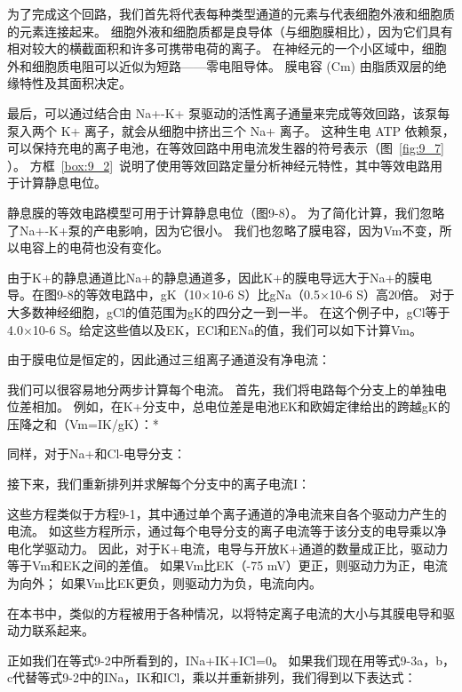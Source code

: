 为了完成这个回路，我们首先将代表每种类型通道的元素与代表细胞外液和细胞质的元素连接起来。
细胞外液和细胞质都是良导体（与细胞膜相比），因为它们具有相对较大的横截面积和许多可携带电荷的离子。
在神经元的一个小区域中，细胞外和细胞质电阻可以近似为短路——零电阻导体。
膜电容 (Cm) 由脂质双层的绝缘特性及其面积决定。


最后，可以通过结合由 Na+-K+ 泵驱动的活性离子通量来完成等效回路，该泵每泵入两个 K+ 离子，就会从细胞中挤出三个 Na+ 离子。
这种生电 ATP 依赖泵，可以保持充电的离子电池，在等效回路中用电流发生器的符号表示（图~\ref{fig:9_7} ）。
方框~\ref{box:9_2}~说明了使用等效回路定量分析神经元特性，其中等效电路用于计算静息电位。


\begin{proposition}[利用等效电路模型计算静息膜电位] \label{box:9_2}
	
	\quad \quad 静息膜的等效电路模型可用于计算静息电位（图9-8）。
	为了简化计算，我们忽略了Na+-K+泵的产电影响，因为它很小。
	我们也忽略了膜电容，因为Vm不变，所以电容上的电荷也没有变化。
	
	\quad \quad 由于K+的静息通道比Na+的静息通道多，因此K+的膜电导远大于Na+的膜电导。在图9-8的等效电路中，gK（10×10-6 S）比gNa（0.5×10-6 S）高20倍。
	对于大多数神经细胞，gCl的值范围为gK的四分之一到一半。
	在这个例子中，gCl等于4.0×10-6 S。给定这些值以及EK，ECl和ENa的值，我们可以如下计算Vm。
	
	\quad \quad 由于膜电位是恒定的，因此通过三组离子通道没有净电流：
	
	\quad \quad 我们可以很容易地分两步计算每个电流。
	首先，我们将电路每个分支上的单独电位差相加。
	例如，在K+分支中，总电位差是电池EK和欧姆定律给出的跨越gK的压降之和（Vm=IK/gK）：*
	
	\quad \quad 同样，对于Na+和Cl-电导分支：
	
	\quad \quad 接下来，我们重新排列并求解每个分支中的离子电流I：
	
	\quad \quad 这些方程类似于方程9-1，其中通过单个离子通道的净电流来自各个驱动力产生的电流。
	如这些方程所示，通过每个电导分支的离子电流等于该分支的电导乘以净电化学驱动力。
	因此，对于K+电流，电导与开放K+通道的数量成正比，驱动力等于Vm和EK之间的差值。
	如果Vm比EK（-75 mV）更正，则驱动力为正，电流为向外；
	如果Vm比EK更负，则驱动力为负，电流向内。
	
	\quad \quad 在本书中，类似的方程被用于各种情况，以将特定离子电流的大小与其膜电导和驱动力联系起来。
	
	\quad \quad 正如我们在等式9-2中所看到的，INa+IK+ICl=0。
	如果我们现在用等式9-3a，b，c代替等式9-2中的INa，IK和ICl，乘以并重新排列，我们得到以下表达式：
	

\end{proposition}
